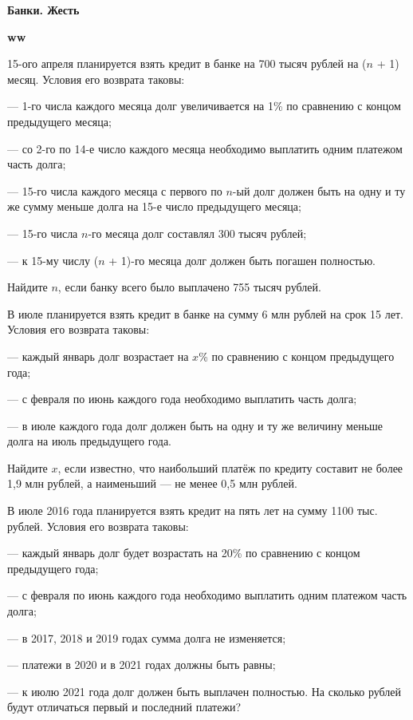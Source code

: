 \centerline{\bf \Huge Банки. Жесть}
\centerline{\bf \Huge }

\begin{flushright}
        \scriptsize{\textbf{ww}}
\end{flushright}

 15-ого апреля планируется взять кредит в банке на 700 тысяч рублей на ($n$ + 1) месяц.
Условия его возврата таковы:

— 1-го числа каждого месяца долг увеличивается на 1\% по сравнению с концом предыдущего
месяца;

— со 2-го по 14-е число каждого месяца необходимо выплатить одним платежом часть долга;

— 15-го числа каждого месяца с первого по $n$-ый долг должен быть на одну и ту же сумму
меньше долга на 15-е число предыдущего месяца;

— 15-го числа $n$-го месяца долг составлял 300 тысяч рублей;

— к 15-му числу ($n$ + 1)-го месяца долг должен быть погашен полностью.

Найдите $n$, если банку всего было выплачено 755 тысяч рублей.

 В июле планируется взять кредит в банке на сумму 6 млн рублей на срок 15 лет. Условия его возврата таковы:

— каждый январь долг возрастает на $x$\% по сравнению с концом предыдущего года;

— с февраля по июнь каждого года необходимо выплатить часть долга;

— в июле каждого года долг должен быть на одну и ту же величину меньше долга на июль
предыдущего года.

Найдите $x$, если известно, что наибольший платёж по кредиту составит не более 1,9 млн
рублей, а наименьший — не менее 0,5 млн рублей.


 В июле 2016 года планируется взять кредит на пять лет на сумму 1100 тыс. рублей.
Условия его возврата таковы:

— каждый январь долг будет возрастать на 20\% по сравнению с концом предыдущего года;

— с февраля по июнь каждого года необходимо выплатить одним платежом часть долга;

— в 2017, 2018 и 2019 годах сумма долга не изменяется;

— платежи в 2020 и в 2021 годах должны быть равны;

— к июлю 2021 года долг должен быть выплачен полностью.
На сколько рублей будут отличаться первый и последний платежи?

